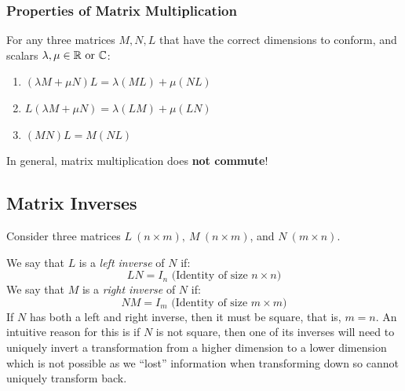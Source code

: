 \documentclass[../main.tex]{subfiles}
\begin{document}
\subsubsection{Properties of Matrix Multiplication}
For any three matrices $M, N, L$ that have the correct dimensions to conform, and scalars $\lambda, \mu \in \mathbb{R} \text{ or } \mathbb{C}$:
\begin{enumerate}
  \item $(\lambda M + \mu N)L = \lambda(ML) + \mu(NL)$
  \item $L(\lambda M + \mu N) = \lambda(LM) + \mu(LN)$
  \item $(MN)L = M(NL)$
\end{enumerate}
\begin{remark}[Warning]
  In general, matrix multiplication does \textbf{not commute}!
\end{remark}
\subsection{Matrix Inverses}
Consider three matrices $L\ (n \times m),\ M\ (n \times m)$, and $N\ (m \times n)$.

We say that $L$ is a \textit{left inverse} of $N$ if:
\[
  LN = I_n \text{ (Identity of size $n \times n$)}
\]
We say that $M$ is a \textit{right inverse} of $N$ if:
\[
  NM = I_m \text{ (Identity of size $m \times m$)}
\]
If $N$ has both a left and right inverse, then it must be square, that is, $m = n$.
An intuitive reason for this is if $N$ is not square, then one of its inverses will need to uniquely invert a transformation from a higher dimension to a lower dimension which is not possible as we ``lost'' information when transforming down so cannot uniquely transform back.
\end{document}
